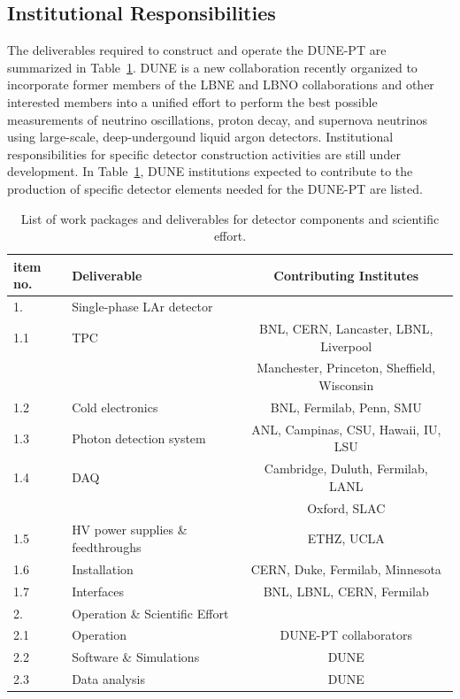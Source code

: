\subsection{Institutional Responsibilities}

The deliverables required to construct and operate the DUNE-PT are summarized in Table~\ref{tab:wbs-detector}.  DUNE is a new collaboration 
recently organized to incorporate former members of the LBNE and LBNO collaborations and other interested members into a unified 
effort to perform the best possible measurements of neutrino oscillations, proton decay, and supernova neutrinos using large-scale, 
deep-undergound liquid argon detectors.  Institutional responsibilities for specific detector construction activities are still 
under development.  In Table~\ref{tab:wbs-detector}, DUNE institutions expected to contribute to the production of specific detector elements 
needed for the DUNE-PT are listed. 
%
\begin{table}[h]
\centering
\begin{tabular}{|l l c|}
\hline
\textbf{item no. } & \textbf{Deliverable}  & \textbf{Contributing Institutes}  \\ \hline

1.   & Single-phase LAr detector & \\
1.1  & TPC & BNL, CERN, Lancaster, LBNL, Liverpool \\
  &  & Manchester, Princeton, Sheffield, Wisconsin \\
1.2  & Cold electronics  & BNL, Fermilab, Penn, SMU \\ 
1.3  & Photon detection system  &  ANL, Campinas, CSU, Hawaii, IU, LSU \\
1.4  & DAQ & Cambridge, Duluth,  Fermilab, LANL \\
       &          & Oxford, SLAC \\
1.5  & HV power supplies \& feedthroughs  &  ETHZ, UCLA \\
1.6  & Installation & CERN, Duke, Fermilab, Minnesota \\ 
1.7  & Interfaces  & BNL, LBNL, CERN, Fermilab  \\ \hline

2.   & Operation \& Scientific Effort & \\ 
2.1 & Operation & DUNE-PT collaborators \\
2.2  & Software \& Simulations &  DUNE \\
2.3  & Data analysis &  DUNE \\ \hline

\end{tabular}
\caption{List of work packages and deliverables for detector components and scientific effort.} 
\label{tab:wbs-detector}
\end{table}

